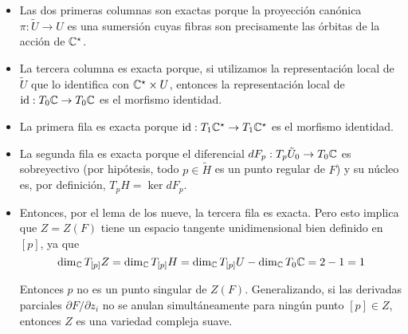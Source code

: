 \begin{solution}
\begin{itemize}
    \item Las dos primeras columnas son exactas porque la proyección canónica $\pi : \tilde U \to U$ es una sumersión cuyas fibras son precisamente las órbitas de la acción de $\mathbb C^\star$.
    
    \item La tercera columna es exacta porque, si utilizamos la representación local de $\tilde U$ que lo identifica con $\mathbb C^\star \times U$, entonces la representación local de $\operatorname{id} : T_0 \mathbb C \to T_0 \mathbb C$ es el morfismo identidad.
    
    \item La primera fila es exacta porque $\operatorname{id} : T_1\mathbb C^\star \to T_1\mathbb C^\star$ es el morfismo identidad.
    
    \item La segunda fila es exacta porque el diferencial $dF_p : T_p\tilde U_0 
    \to T_0\mathbb C$ es sobreyectivo (por hipótesis, todo $p \in \tilde H$ es un punto regular de $F$) y su núcleo es, por definición, $T_pH = \ker dF_p$.
    
    \item Entonces, por el lema de los nueve, la tercera fila es exacta. Pero esto implica que $Z = Z(F)$ tiene un espacio tangente unidimensional bien definido en $[p]$, ya que
    $$\dim_\mathbb C T_{[p]} Z = \dim_\mathbb C T_{[p]} H = \dim_\mathbb C T_{[p]} U - \dim_\mathbb C T_0 \mathbb C = 2 - 1 = 1$$
    
    Entonces $p$ no es un punto singular de $Z(F)$. Generalizando, si las derivadas parciales $\partial F / \partial z_i$ no se anulan simultáneamente para ningún punto $[p] \in Z$, entonces $Z$ es una variedad compleja suave.
\end{itemize}
\end{solution}

